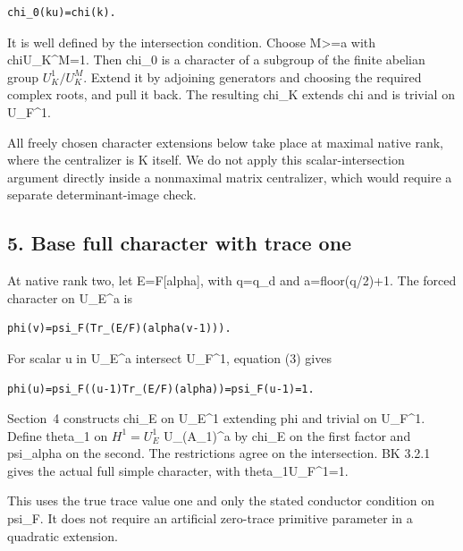 \begin{Verbatim}[fontsize=\small,breaklines=true,breakanywhere=true]
chi_0(ku)=chi(k).
\end{Verbatim}

It is well defined by the intersection condition. Choose M\textgreater=a
with chi\textbar U\_K\^{}M=1. Then chi\_0 is a character of a subgroup
of the finite abelian group \(U_K^1/U_K^M\). Extend it by
adjoining generators and choosing the required complex roots, and pull
it back. The resulting chi\_K extends chi and is trivial on U\_F\^{}1.

All freely chosen character extensions below take place at maximal
native rank, where the centralizer is K itself. We do not apply this
scalar-intersection argument directly inside a nonmaximal matrix
centralizer, which would require a separate determinant-image check.

\hypertarget{dyadic_character-base-full-character-with-trace-one}{%
\subsection{5. Base full character with trace
one}\label{dyadic_character-base-full-character-with-trace-one}}

At native rank two, let E=F{[}alpha{]}, with q=q\_d and a=floor(q/2)+1.
The forced character on U\_E\^{}a is

\begin{Verbatim}[fontsize=\small,breaklines=true,breakanywhere=true]
phi(v)=psi_F(Tr_(E/F)(alpha(v-1))).
\end{Verbatim}

For scalar u in U\_E\^{}a intersect U\_F\^{}1, equation (3) gives

\begin{Verbatim}[fontsize=\small,breaklines=true,breakanywhere=true]
phi(u)=psi_F((u-1)Tr_(E/F)(alpha))=psi_F(u-1)=1.
\end{Verbatim}

Section~4 constructs chi\_E on U\_E\^{}1 extending phi and trivial on
U\_F\^{}1. Define theta\_1 on \(H^1=U_E^1\) U\_(A\_1)\^{}a
by chi\_E on the first factor and psi\_alpha on the second. The
restrictions agree on the intersection. BK 3.2.1 gives the actual full
simple character, with theta\_1\textbar U\_F\^{}1=1.

This uses the true trace value one and only the stated conductor
condition on psi\_F. It does not require an artificial zero-trace
primitive parameter in a quadratic extension.

